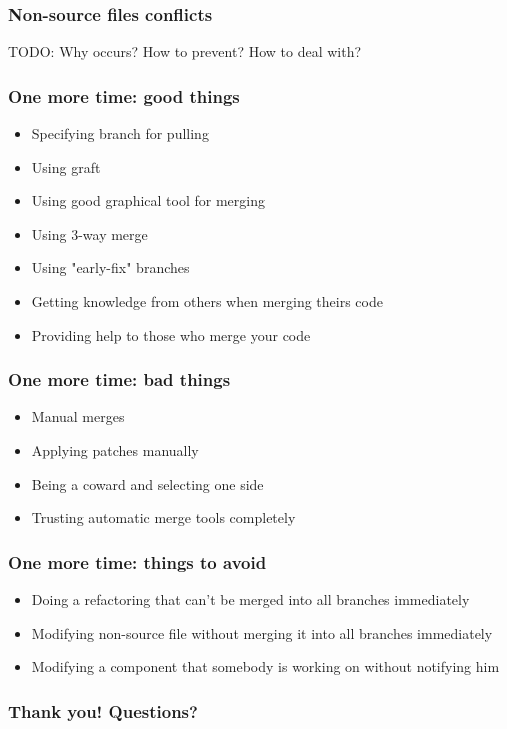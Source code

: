 \documentclass{beamer}
\begin{document}
\begin{frame}
\frametitle{Non-source files conflicts}
TODO: Why occurs? How to prevent? How to deal with? 
\end{frame}


\begin{frame}
\frametitle{One more time: good things}
\begin{itemize}
\item Specifying branch for pulling
\item Using graft
\item Using good graphical tool for merging
\item Using 3-way merge
\item Using "early-fix" branches
\item Getting knowledge from others when merging theirs code
\item Providing help to those who merge your code
\end{itemize}
\end{frame}

\begin{frame}
\frametitle{One more time: bad things}
\begin{itemize}
\item Manual merges
\item Applying patches manually
\item Being a coward and selecting one side
\item Trusting automatic merge tools completely
\end{itemize}
\end{frame}

\begin{frame}
\frametitle{One more time: things to avoid}
\begin{itemize}
\item Doing a refactoring that can't be merged into all branches immediately
\item Modifying non-source file without merging it into all branches immediately
\item Modifying a component that somebody is working on without notifying him 
\end{itemize}
\end{frame}


\begin{frame}
\frametitle{Thank you! Questions?}
\begin{center}
\end{center}
\end{frame}
\end{document}

